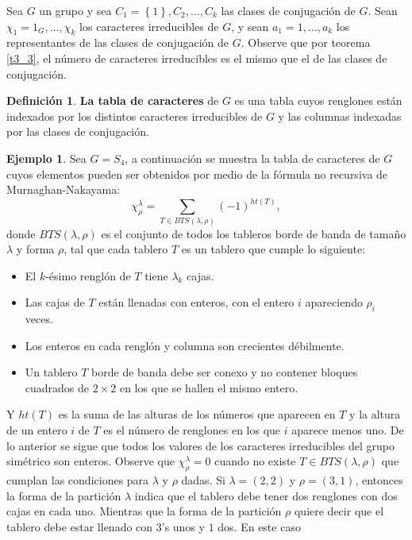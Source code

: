 \documentclass[12pt]{book}
\theoremstyle{definition}
\newtheorem{definition}[theorem]{Definición}
\newtheorem{example}[theorem]{Ejemplo}
\newcounter{in}
\newcounter{ini}
\begin{document}
Sea $G$ un grupo y sea $C_1 = \left \{ 1 \right \}, C_2, \ldots, C_k$
las clases de conjugación de $G$. Sean $\chi_1 = 1_G, \ldots, \chi_k$
los caracteres irreducibles de $G$, y sean $a_1 = 1, \ldots, a_k$ los
representantes de las clases de conjugación de $G$. Observe que por
teorema \ref{t3_3}, el número de caracteres irreducibles es el mismo
que el de las clases de conjugación. 
\begin{definition}
\textbf{La tabla de caracteres} de $G$ es
una tabla cuyos renglones están indexados por los distintos caracteres
irreducibles de $G$ y las columnas indexadas por las clases de
conjugación.
\end{definition}
\begin{example}
\label{caracteres-S4}
Sea $G = S_4$, a continuación se muestra la tabla de caracteres de $G$
cuyos elementos pueden ser obtenidos por medio de la fórmula no
recursiva de Murnaghan-Nakayama:
\begin{equation}
\chi_{\rho}^{\lambda} = \sum_{T \in BTS(\lambda,\rho)} (-1)^{ht(T)},
\end{equation}
donde $BTS(\lambda,\rho)$ es el conjunto de todos los tableros borde de banda
 de tamaño $\lambda$ y forma $\rho$, tal que cada tablero $T$ es
un tablero que cumple lo siguiente:
\begin{itemize}
\item El $k$-ésimo renglón de $T$ tiene $\lambda_{k}$ cajas.
\item Las cajas de $T$ están llenadas con enteros, con el entero $i$
  apareciendo $\rho_i$ veces.
\item Los enteros en cada renglón y columna son crecientes
  débilmente.
\item Un tablero $T$ borde de banda debe ser conexo y no contener bloques cuadrados de $2 \times 2$ en
  los que se hallen el mismo entero.
\end{itemize}
Y $ht(T)$ es la suma de las alturas de los números que aparecen en $T$ y la altura
de un entero $i$ de $T$ es el número de renglones en los
que $i$ aparece menos uno. De lo anterior se sigue que todos los
valores de los caracteres irreducibles del grupo simétrico son
enteros. Observe que $\chi_{\rho}^{\lambda} = 0$ cuando no existe
$T \in BTS(\lambda,\rho)$ que cumplan las condiciones para $\lambda$ y $\rho$ dadas.  Si
$\lambda = (2,2)$ y $\rho = (3,1)$, entonces la forma de la partición
$\lambda$ indica que el tablero debe tener dos renglones con dos cajas
en cada uno. Mientras que la forma de la partición $\rho$ quiere decir que
el tablero debe estar llenado con $3$'s unos y $1$ dos. En este caso

\end{example}
\end{document}
